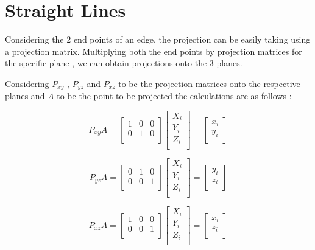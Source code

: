 \documentclass[12pt,a4paper]{article}
\begin{document}
\section{Straight Lines}

Considering the 2 end points of an edge, the projection can be easily taking using a projection matrix. Multiplying both the end points by projection matrices for the specific plane , we can obtain projections onto the 3 planes. \newline

Considering $ P_{xy}$ , $P_{yz}$ and $P_{xz} $ to be the projection matrices onto the respective planes and \boldmath$A$ to be the point to be projected the calculations are as follows :- 


\begin{equation}
P_{xy}  A =
\begin{bmatrix}
1&0&0\\
0&1&0\\
\end{bmatrix}
\begin{bmatrix}
X_i\\
Y_i\\
Z_i\\
\end{bmatrix}
=
\begin{bmatrix}
x_i\\
y_i\\
\end{bmatrix}
\end{equation}

\begin{equation}
P_{yz}  A =
\begin{bmatrix}
0&1&0\\
0&0&1\\
\end{bmatrix}
\begin{bmatrix}
X_i\\
Y_i\\
Z_i\\
\end{bmatrix}
=
\begin{bmatrix}
y_i\\
z_i\\
\end{bmatrix}
\end{equation}

\begin{equation}
P_{xz}  A =
\begin{bmatrix}
1&0&0\\
0&0&1\\
\end{bmatrix}
\begin{bmatrix}
X_i\\
Y_i\\
Z_i\\
\end{bmatrix}
=
\begin{bmatrix}
x_i\\
z_i\\
\end{bmatrix}
\end{equation}
\end{document}
